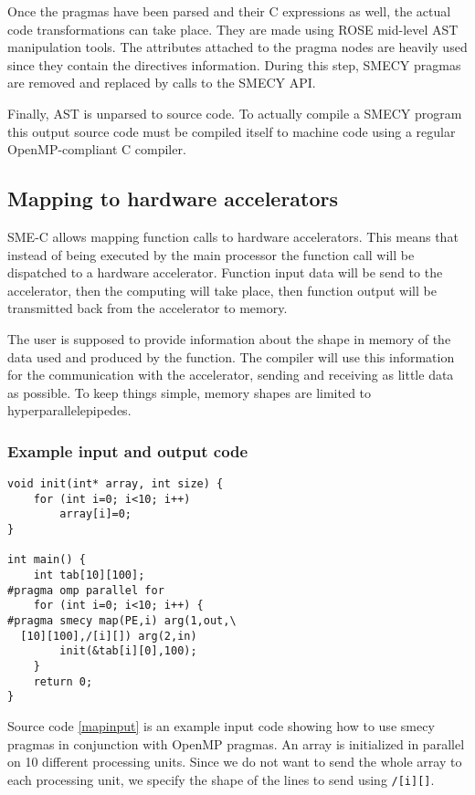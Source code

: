 \documentclass[a4paper]{article}
\begin{document}
	Once the pragmas have been parsed and their C expressions as well, the actual code transformations can take place. They are made using ROSE mid-level AST manipulation tools. The attributes attached to the pragma nodes are heavily used since they contain the directives information. During this step, SMECY pragmas are removed and replaced by calls to the SMECY API.
	
	Finally, AST is unparsed to source code. To actually compile a SMECY program this output source code must be compiled itself to machine code using a regular OpenMP-compliant C compiler.
	
	
	\subsection{Mapping to hardware accelerators}
	SME-C allows mapping function calls to hardware accelerators. This means that instead of being executed by the main processor the function call will be dispatched to a hardware accelerator. Function input data will be send to the accelerator, then the computing will take place, then function output will be transmitted back from the accelerator to memory.
	
	The user is supposed to provide information about the shape in memory of the data used and produced by the function. The compiler will use this information for the communication with the accelerator, sending and receiving as little data as possible. To keep things simple, memory shapes are limited to hyperparallelepipedes.
	
	\subsubsection{Example input and output code}
	
	\begin{lstlisting}[label=mapinput,caption={Input code with hardware mapping pragma}]
void init(int* array, int size) {
	for (int i=0; i<10; i++)
		array[i]=0;
}

int main() {
	int tab[10][100];
#pragma omp parallel for
	for (int i=0; i<10; i++) {
#pragma smecy map(PE,i) arg(1,out,\
  [10][100],/[i][]) arg(2,in)
		init(&tab[i][0],100);
	}
	return 0;
}
	\end{lstlisting}
	
	Source code \ref{mapinput} is an example input code showing how to use smecy pragmas in conjunction with OpenMP pragmas. An array is initialized in parallel on 10 different processing units. Since we do not want to send the whole array to each processing unit, we specify the shape of the lines to send using \verb+/[i][]+.
	
\end{document}
